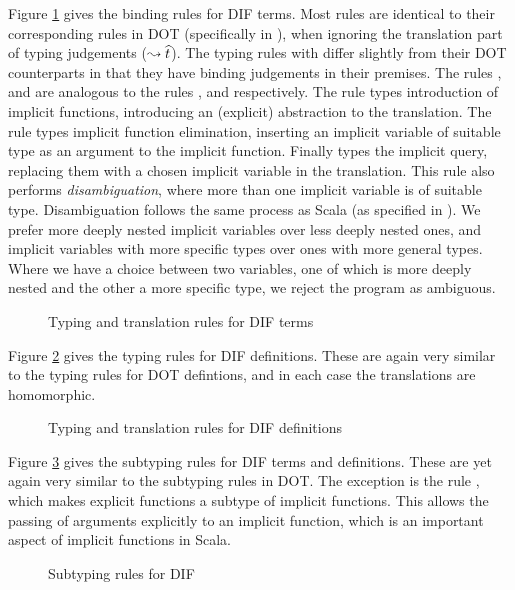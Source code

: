 Figure \ref{figure_typing_rules_terms} gives the binding rules for DIF terms.
Most rules are identical to their corresponding rules in DOT (specifically in
\cite{AGORS16}), when ignoring the translation part of typing judgements
($\leadsto \widehat{t}$). The typing rules with differ slightly from their DOT
counterparts in that they have binding judgements in their premises. The rules
,  and  are analogous to the rules
,  and  respectively. The rule
 types introduction of implicit functions, introducing an
(explicit) abstraction to the translation. The rule  types
implicit function elimination, inserting an implicit variable of suitable type
as an argument to the implicit function. Finally  types the
implicit query, replacing them with a chosen implicit variable in the
translation. This rule also performs \emph{disambiguation}, where more than one
implicit variable is of suitable type. Disambiguation follows the same process
as Scala (as specified in \cite{OBLB18}). We prefer more deeply nested implicit
variables over less deeply nested ones, and implicit variables with more
specific types over ones with more general types. Where we have a choice
between two variables, one of which is more deeply nested and the other a more
specific type, we reject the program as ambiguous.

\begin{figure}[h]
    
    \caption{Typing and translation rules for DIF terms}
    \label{figure_typing_rules_terms}
\end{figure}

Figure \ref{figure_typing_rules_definitions} gives the typing rules for DIF
definitions. These are again very similar to the typing rules for DOT
defintions, and in each case the translations are homomorphic.

\begin{figure}[h]
    
    \caption{Typing and translation rules for DIF definitions}
    \label{figure_typing_rules_definitions}
\end{figure}

Figure \ref{figure_subtyping_rules} gives the subtyping rules for DIF terms and
definitions. These are yet again very similar to the subtyping rules in DOT.
The exception is the rule , which makes explicit functions
a subtype of implicit functions. This allows the passing of arguments
explicitly to an implicit function, which is an important aspect of implicit functions in Scala.

\begin{figure}[h]
    
    \caption{Subtyping rules for DIF}
    \label{figure_subtyping_rules}
\end{figure}
